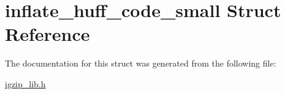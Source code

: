 \hypertarget{structinflate__huff__code__small}{\section{inflate\-\_\-huff\-\_\-code\-\_\-small Struct Reference}
\label{structinflate__huff__code__small}
}


The documentation for this struct was generated from the following file\-:\begin{DoxyCompactItemize}
\item 
\hyperlink{igzip__lib_8h}{igzip\-\_\-lib.\-h}\end{DoxyCompactItemize}
